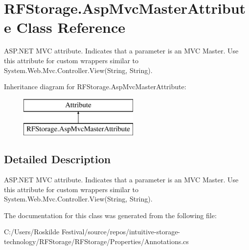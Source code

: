 \hypertarget{class_r_f_storage_1_1_asp_mvc_master_attribute}{}\section{R\+F\+Storage.\+Asp\+Mvc\+Master\+Attribute Class Reference}
\label{class_r_f_storage_1_1_asp_mvc_master_attribute}


A\+S\+P.\+N\+ET M\+VC attribute. Indicates that a parameter is an M\+VC Master. Use this attribute for custom wrappers similar to {\ttfamily System.\+Web.\+Mvc.\+Controller.\+View(\+String, String)}.  


Inheritance diagram for R\+F\+Storage.\+Asp\+Mvc\+Master\+Attribute\+:\begin{figure}[H]
\begin{center}
\leavevmode
\includegraphics[height=2.000000cm]{class_r_f_storage_1_1_asp_mvc_master_attribute}
\end{center}
\end{figure}


\subsection{Detailed Description}
A\+S\+P.\+N\+ET M\+VC attribute. Indicates that a parameter is an M\+VC Master. Use this attribute for custom wrappers similar to {\ttfamily System.\+Web.\+Mvc.\+Controller.\+View(\+String, String)}. 



The documentation for this class was generated from the following file\+:\begin{DoxyCompactItemize}
\item 
C\+:/\+Users/\+Roskilde Festival/source/repos/intuitive-\/storage-\/technology/\+R\+F\+Storage/\+R\+F\+Storage/\+Properties/Annotations.\+cs\end{DoxyCompactItemize}
